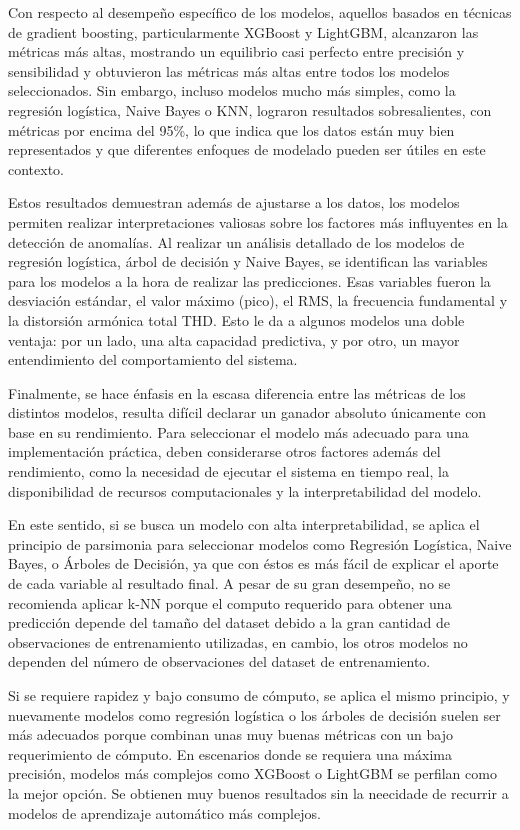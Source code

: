 \documentclass[11pt,a4paper,spanish]{book}
\numberwithin{equation}{chapter}
\numberwithin{figure}{chapter}
\begin{document}
Con respecto al desempeño específico de los modelos, aquellos basados en técnicas de 
gradient boosting, particularmente XGBoost y LightGBM, alcanzaron las métricas más altas, 
mostrando un equilibrio casi perfecto entre precisión y sensibilidad y obtuvieron las 
métricas más altas entre todos los modelos seleccionados. Sin embargo, incluso modelos 
mucho más simples, como la regresión logística, Naive Bayes o KNN, lograron resultados 
sobresalientes, con métricas por encima del 95\%, lo que indica que los datos están muy 
bien representados y que diferentes enfoques de modelado pueden ser útiles en este 
contexto.


Estos resultados demuestran además de ajustarse a los datos, los modelos permiten 
realizar interpretaciones valiosas sobre los factores más influyentes en la detección 
de anomalías. 
Al realizar un análisis detallado de los modelos de regresión logística, árbol de 
decisión y Naive Bayes, se identifican las variables para los modelos a la hora de 
realizar las predicciones. Esas variables fueron la desviación estándar, el valor 
máximo (pico), el RMS, la frecuencia fundamental y la distorsión armónica total THD. 
Esto le da a algunos modelos una doble ventaja: por un lado, una alta capacidad 
predictiva, y por otro, un mayor entendimiento del comportamiento del sistema.


Finalmente, se hace énfasis en la escasa diferencia entre las métricas de los distintos
modelos, resulta difícil declarar un ganador absoluto únicamente con base en su 
rendimiento. 
Para seleccionar el modelo más adecuado para una implementación práctica, deben 
considerarse otros factores además del rendimiento, como la necesidad de ejecutar el 
sistema en tiempo real, la disponibilidad de recursos computacionales y la 
interpretabilidad del modelo. 


En este sentido,  si se busca un modelo con alta interpretabilidad, se aplica el 
principio de parsimonia para seleccionar modelos como Regresión Logística, Naive Bayes,
o Árboles de Decisión, ya que con éstos es  más fácil de explicar el aporte de cada 
variable al  resultado final. A pesar de su gran desempeño, no se recomienda aplicar 
k-NN porque el computo requerido para obtener una predicción depende del tamaño del 
dataset debido a la gran cantidad de observaciones de entrenamiento utilizadas, en cambio,
los otros modelos no dependen del número de observaciones del dataset de entrenamiento. 


Si se requiere rapidez y bajo consumo de cómputo, se aplica el mismo principio, y 
nuevamente modelos como regresión logística o los árboles de decisión suelen ser más 
adecuados porque combinan unas muy buenas métricas con un bajo requerimiento de cómputo.
En escenarios donde se requiera una máxima precisión, modelos más complejos como 
XGBoost o LightGBM se perfilan como la mejor opción. Se obtienen muy buenos resultados
sin la neecidade de recurrir a modelos de aprendizaje automático más complejos. 
\end{document}
